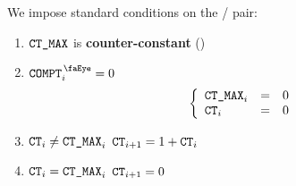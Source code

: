 We impose standard conditions on the \ct{} / \maxCt{} pair:
\begin{enumerate}
	\item $\texttt{CT\_MAX}$ is \textbf{counter-constant} \quad (\sanityCheck)
	\item $\isRlpUtilsCompt _{i} = 0$ \Then
		\[
			\left\{ \begin{array}{lclr}
				\texttt{CT\_MAX} _{i} & = & 0 \\
				\texttt{CT}    _{i} & = & 0 \\
			\end{array} \right.
		\]
	\item \If $\texttt{CT} _{i} \neq \texttt{CT\_MAX} _{i}$ \Then $\texttt{CT} _{i + 1} = 1 + \texttt{CT} _{i}$
	\item \If $\texttt{CT} _{i} =    \texttt{CT\_MAX} _{i}$ \Then $\texttt{CT} _{i + 1} = 0$
\end{enumerate}
